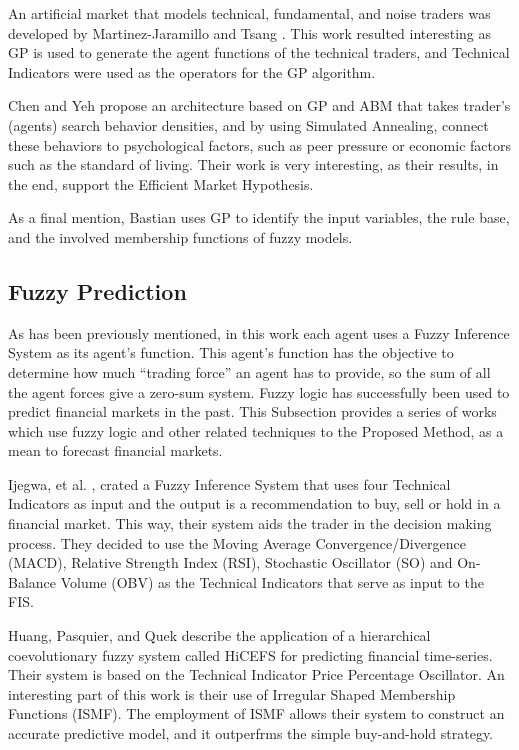 \documentclass[12pt,journal,draftcls,onecolumn]{IEEEtran}
\begin{document}
An artificial market that models technical, fundamental, and noise traders was developed by Martinez-Jaramillo and Tsang \cite{Martinez-Jaramillo2009}. This work resulted interesting as GP is used to generate the agent functions of the technical traders, and Technical Indicators were used as the operators for the GP algorithm.

Chen and Yeh \cite{Chen2001} propose an architecture based on GP and ABM that takes trader's (agents) search behavior densities, and by using Simulated Annealing, connect these behaviors to psychological factors, such as peer pressure or economic factors such as the standard of living. Their work is very interesting, as their results, in the end, support the Efficient Market Hypothesis.

As a final mention, Bastian \cite{Bastian2000} uses GP to identify the input variables, the rule base, and the involved membership functions of fuzzy models.

\subsection{Fuzzy Prediction}
\label{fuzzy-prediction}

As has been previously mentioned, in this work each agent uses a Fuzzy Inference System as its agent's function. This agent's function has the objective to determine how much ``trading force'' an agent has to provide, so the sum of all the agent forces give a zero-sum system. Fuzzy logic has successfully been used to predict financial markets in the past. This Subsection provides a series of works which use fuzzy logic and other related techniques to the Proposed Method, as a mean to forecast financial markets.

Ijegwa, et al. \cite{Ijegwa2014}, crated a Fuzzy Inference System that uses four Technical Indicators as input and the output is a recommendation to buy, sell or hold in a financial market. This way, their system aids the trader in the decision making process. They decided to use the Moving Average Convergence/Divergence (MACD), Relative Strength Index (RSI), Stochastic Oscillator (SO) and On-Balance Volume (OBV) as the Technical Indicators that serve as input to the FIS.

Huang, Pasquier, and Quek \cite{Huang2009} describe the application of a hierarchical coevolutionary fuzzy system called HiCEFS for predicting financial time-series. Their system is based on the Technical Indicator Price Percentage Oscillator. An interesting part of this work is their use of Irregular Shaped Membership Functions (ISMF). The employment of ISMF allows their system to construct an accurate predictive model, and it outperfrms the simple buy-and-hold strategy.
\end{document}
